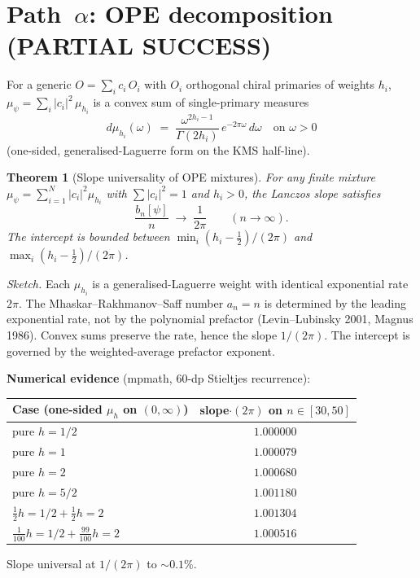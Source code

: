 \documentclass[11pt]{amsart}
\newtheorem{theorem}{Theorem}[section]
\theoremstyle{remark}
\newcommand{\bn}{b_n}
\begin{document}
\section{Path~$\alpha$: OPE decomposition (PARTIAL SUCCESS)}

For a generic $O=\sum_i c_i\,O_i$ with $O_i$ orthogonal chiral primaries of
weights $h_i$, $\mu_\psi=\sum_i|c_i|^2\,\mu_{h_i}$ is a convex sum of
single-primary measures
\[
   d\mu_{h_i}(\omega) \;=\;
   \frac{\omega^{2h_i-1}}{\Gamma(2h_i)}\,e^{-2\pi\omega}\,d\omega
   \quad \text{on } \omega>0
\]
(one-sided, generalised-Laguerre form on the KMS half-line).

\begin{theorem}[Slope universality of OPE mixtures]\label{thm:alpha}
For any finite mixture $\mu_\psi=\sum_{i=1}^N|c_i|^2\mu_{h_i}$ with
$\sum|c_i|^2=1$ and $h_i>0$, the Lanczos slope satisfies
\[
   \frac{\bn[\psi]}{n} \;\to\; \frac{1}{2\pi} \qquad (n\to\infty).
\]
The intercept is bounded between $\min_i(h_i-\tfrac12)/(2\pi)$ and
$\max_i(h_i-\tfrac12)/(2\pi)$.
\end{theorem}

\noindent\textit{Sketch.} Each $\mu_{h_i}$ is a generalised-Laguerre weight with
identical exponential rate $2\pi$. The Mhaskar--Rakhmanov--Saff number
$a_n=n$ is determined by the leading exponential rate, not by the polynomial
prefactor (Levin--Lubinsky 2001, Magnus 1986). Convex sums preserve the
rate, hence the slope $1/(2\pi)$. The intercept is governed by the
weighted-average prefactor exponent.

\noindent\textbf{Numerical evidence} (mpmath, 60-dp Stieltjes recurrence):
\begin{center}
\begin{tabular}{lc}
\toprule
Case (one-sided $\mu_h$ on $(0,\infty)$) & slope$\cdot(2\pi)$ on $n\in[30,50]$\\
\midrule
pure $h=1/2$ & $1.000000$\\
pure $h=1$ & $1.000079$\\
pure $h=2$ & $1.000680$\\
pure $h=5/2$ & $1.001180$\\
$\tfrac12 h=1/2 + \tfrac12 h=2$ & $1.001304$\\
$\tfrac{1}{100} h=1/2 + \tfrac{99}{100} h=2$ & $1.000516$\\
\bottomrule
\end{tabular}
\end{center}
Slope universal at $1/(2\pi)$ to $\sim 0.1\%$.
\end{document}
